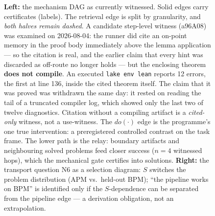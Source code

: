 \documentclass[11pt]{article}
\newcommand{\node}[1]{\textbf{#1}}
\begin{document}
\begin{figure}[t]
\begin{minipage}[c]{0.64\textwidth}
\end{minipage}\hfill
\begin{minipage}[c]{0.32\textwidth}
\centering
{}
\end{minipage}
\caption{\textbf{Left:} the mechanism DAG as currently witnessed.
Solid edges carry certificates (labels). The retrieval edge is
split by granularity, and \emph{both halves remain dashed}. A
candidate step-level witness (a96A08) was examined on 2026-08-04: the
runner did cite an on-point memory in the proof body immediately above
the lemma application --- so the citation is real, and the earlier
claim that every hint was discarded as off-route no longer holds ---
but the enclosing theorem \textbf{does not compile}. An executed
\texttt{lake env lean} reports 12 errors, the first at line 136,
inside the cited theorem itself. The claim that it was proved was
withdrawn the same day: it rested on reading the tail of a truncated
compiler log, which showed only the last two of twelve diagnostics.
Citation without a compiling artifact is a \emph{cited-only} witness,
not a use-witness. The $do(\cdot)$ edge is the programme's one true
intervention: a preregistered controlled contrast on the task
frame. The lower path is the relay: boundary artifacts and
neighbouring solved problems feed closer success ($n{=}4$
witnessed hops), which the mechanical gate certifies into
solutions. \textbf{Right:} the transport question N6 as a
selection diagram: $S$ switches the problem distribution (APM
vs.\ held-out BPM); ``the pipeline works on BPM'' is identified
only if the $S$-dependence can be separated from the pipeline
edge --- a derivation obligation, not an extrapolation.}
\label{fig:dag}
\end{figure}
\end{document}
